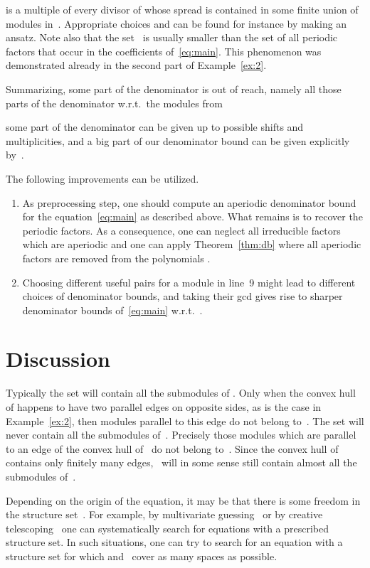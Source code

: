 \documentclass[a4paper]{sig-alternate}
\begin{document}
is a multiple of every divisor of  whose spread is contained in some finite
union of modules in~. Appropriate choices  and  can be found for instance by making an
ansatz. Note also that the set~ is usually smaller than the set of all
periodic factors that occur in the coefficients 
of~\eqref{eq:main}. This phenomenon was demonstrated already in the second part
of Example~\ref{ex:2}.



Summarizing, some part of the denominator is out of reach, namely all those parts of the denominator w.r.t.\ the modules from

some part of the denominator can be given up to possible shifts and multiplicities, and a big part of our denominator bound can be given explicitly by~.

The following improvements can be utilized.

\begin{enumerate}
\item As preprocessing step, one should compute an aperiodic denominator bound for the equation~\eqref{eq:main} as described above. What remains is to recover the periodic factors. As a consequence, one can neglect all irreducible factors  which are aperiodic and one can apply Theorem~\ref{thm:db} where all aperiodic factors are removed from the polynomials .

\item Choosing different useful pairs for a module  in line~9 might lead to different choices of denominator bounds, and taking their gcd gives rise to sharper denominator bounds of~\eqref{eq:main} w.r.t.\ .
\end{enumerate}


\section{Discussion}

Typically the set  will contain all the submodules of . Only when
the convex hull of  happens to have two parallel edges on opposite sides, as
is the case in Example~\ref{ex:2}, then modules  parallel to this edge do not
belong to~.  The set  will never contain all the submodules of~. Precisely those modules  which are parallel to an edge of the convex
hull of~ do not belong to~. Since the convex hull of  contains only
finitely many edges, ~will in some sense still contain almost all the
submodules of~.

Depending on the origin of the equation, it may be that there is some freedom in
the structure set~. For example, by multivariate guessing~\cite{kauers09a} or
by creative telescoping~\cite{zeilberger91,chyzak00,schneider04c} one can
systematically search for equations with a prescribed structure set. In such
situations, one can try to search for an equation with a structure set for which
 and~ cover as many spaces as possible.
\end{document}

